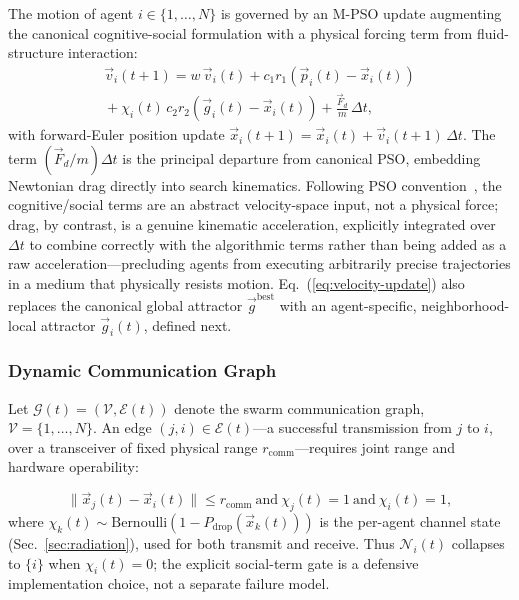 \documentclass[conference]{IEEEtran}
\begin{document}
The motion of agent $i \in \{1,\dots,N\}$ is governed by an M-PSO update augmenting the canonical cognitive-social formulation with a physical forcing term from fluid-structure interaction:
\begin{multline}
\vec{v}_i(t+1) = w\,\vec{v}_i(t) + c_1 r_1 \left(\vec{p}_i(t) - \vec{x}_i(t)\right) \\
{} + \chi_i(t)\, c_2 r_2 \left(\vec{g}_i(t) - \vec{x}_i(t)\right) + \frac{\vec{F}_d}{m}\,\Delta t,
\label{eq:velocity-update}
\end{multline}
with forward-Euler position update $\vec{x}_i(t+1) = \vec{x}_i(t) + \vec{v}_i(t+1)\,\Delta t$. The term $(\vec{F}_d/m)\Delta t$ is the principal departure from canonical PSO, embedding Newtonian drag directly into search kinematics. Following PSO convention~\cite{pso_canonical,shi_eberhart_1998}, the cognitive/social terms are an abstract velocity-space input, not a physical force; drag, by contrast, is a genuine kinematic acceleration, explicitly integrated over $\Delta t$ to combine correctly with the algorithmic terms rather than being added as a raw acceleration---precluding agents from executing arbitrarily precise trajectories in a medium that physically resists motion. Eq.~(\ref{eq:velocity-update}) also replaces the canonical global attractor $\vec{g}^{\text{best}}$ with an agent-specific, neighborhood-local attractor $\vec{g}_i(t)$, defined next.

\subsubsection{Dynamic Communication Graph}
\label{sec:comm-graph}

Let $\mathcal{G}(t) = (\mathcal{V}, \mathcal{E}(t))$ denote the swarm communication graph, $\mathcal{V}=\{1,\dots,N\}$. An edge $(j,i)\in\mathcal{E}(t)$---a successful transmission from $j$ to $i$, over a transceiver of fixed physical range $r_{\text{comm}}$---requires joint range and hardware operability:

\begin{equation}
\|\vec{x}_j(t) - \vec{x}_i(t)\| \le r_{\text{comm}} \ \text{and}\ \chi_j(t) = 1 \ \text{and}\ \chi_i(t) = 1,
\label{eq:comm-edge}
\end{equation}
where $\chi_k(t)\sim\text{Bernoulli}(1-P_{\text{drop}}(\vec{x}_k(t)))$ is the per-agent channel state (Sec.~\ref{sec:radiation}), used for both transmit and receive. Thus $\mathcal{N}_i(t)$ collapses to $\{i\}$ when $\chi_i(t)=0$; the explicit social-term gate is a defensive implementation choice, not a separate failure model.
\end{document}
